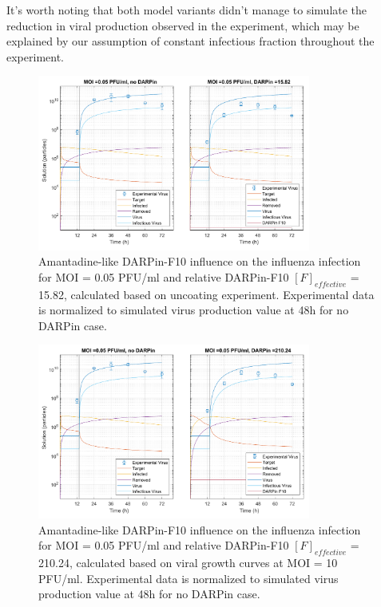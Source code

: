 It's worth noting that both model variants didn't manage to simulate the reduction in viral production observed in the experiment, which may be explained by our assumption of constant infectious fraction throughout the experiment.

\begin{figure}
\begin{center}
\includegraphics[width=0.8\textwidth, trim={0cm 0cm 0cm 0cm}, clip]{D_chapters/3_DARPinModels/2_DARPinInfection/comparisonModelTHillIRVViDelayMOI0.072135DARPin15.816AsymmetricDarpinMyosinInhibitor.pdf}
\caption[Amantadine-like DARPin-F10 for MOI = 0.05 PFU/ml and $F_{effective}$ = 15.82]{Amantadine-like DARPin-F10 influence on the influenza infection for MOI = 0.05 PFU/ml and relative DARPin-F10 $[F]_{effective}$ = 15.82, calculated based on uncoating experiment. Experimental data is normalized to simulated virus production value at 48h for no DARPin case.}
\label{figure:amantadineLikeF15}
\end{center}
\end{figure}

\begin{figure}
\begin{center}
\includegraphics[width=0.8\textwidth, trim={0cm 0cm 0cm 0cm}, clip]{D_chapters/3_DARPinModels/2_DARPinInfection/comparisonModelTHillIRVViDelayMOI0.072135DARPin210.236AsymmetricDarpinMyosinInhibitor.pdf}
\caption[Amantadine-like DARPin-F10 for MOI = 0.05 PFU/ml and $F_{effective}$ = 210.24]{Amantadine-like DARPin-F10 influence on the influenza infection for MOI = 0.05 PFU/ml and relative DARPin-F10 $[F]_{effective}$ = 210.24, calculated based on viral growth curves at MOI = 10 PFU/ml. Experimental data is normalized to simulated virus production value at 48h for no DARPin case.}
\label{figure:amantadineLikeF210}
\end{center}
\end{figure}

